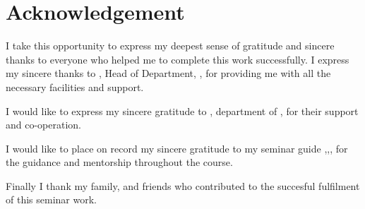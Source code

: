 \chapter*{Acknowledgement}%
%



I take this opportunity to express my deepest sense of gratitude and sincere thanks to everyone who helped me to complete this work successfully. I express my sincere thanks to \textbf{ \hod}, Head of Department, \dept, \college\hspace*{2pt} \collegeplace \hspace*{2pt} for providing  me with all the necessary facilities and support.\par

 I would like to express my sincere gratitude to \textbf{\semcordinatorA}, \hspace*{2pt} department of \hspace*{2pt} \dept, \hspace*{2pt} \college \hspace*{2pt} \collegeplace \hspace*{2pt} for their support and co-operation.

\noindent I would like to place on record my sincere gratitude to my seminar guide \textbf{\guide},\hspace*{2pt}\guidedes,\hspace*{2pt}\dept,\hspace*{2pt}\college \hspace*{2pt} for the guidance and mentorship throughout the course.

Finally I thank my family, and friends who contributed to the succesful fulfilment of this seminar work.

\vspace*{30pt}
\begin{flushright}
	\textbf{\author}
\end{flushright}
\thispagestyle{plain}
